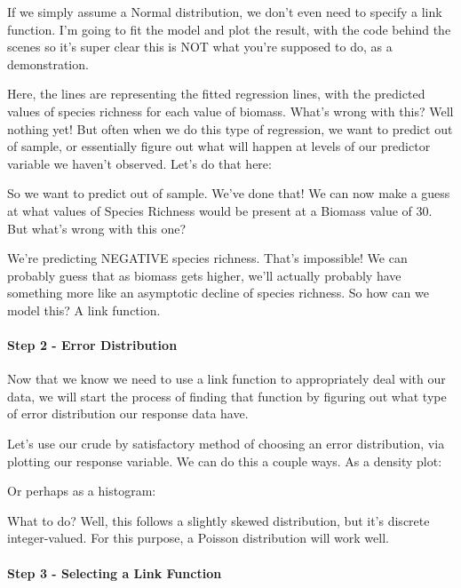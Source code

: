 \documentclass[
]{article}
\begin{document}
If we simply assume a Normal distribution, we don't even need to specify
a link function. I'm going to fit the model and plot the result, with
the code behind the scenes so it's super clear this is NOT what you're
supposed to do, as a demonstration.

Here, the lines are representing the fitted regression lines, with the
predicted values of species richness for each value of biomass. What's
wrong with this? Well nothing yet! But often when we do this type of
regression, we want to predict out of sample, or essentially figure out
what will happen at levels of our predictor variable we haven't
observed. Let's do that here:

So we want to predict out of sample. We've done that! We can now make a
guess at what values of Species Richness would be present at a Biomass
value of 30. But what's wrong with this one?

We're predicting NEGATIVE species richness. That's impossible! We can
probably guess that as biomass gets higher, we'll actually probably have
something more like an asymptotic decline of species richness. So how
can we model this? A link function.

\hypertarget{step-2---error-distribution}{%
\paragraph{Step 2 - Error
Distribution}\label{step-2---error-distribution}}

Now that we know we need to use a link function to appropriately deal
with our data, we will start the process of finding that function by
figuring out what type of error distribution our response data have.

Let's use our crude by satisfactory method of choosing an error
distribution, via plotting our response variable. We can do this a
couple ways. As a density plot:

Or perhaps as a histogram:

What to do? Well, this follows a slightly skewed distribution, but it's
discrete integer-valued. For this purpose, a Poisson distribution will
work well.

\hypertarget{step-3---selecting-a-link-function}{%
\paragraph{Step 3 - Selecting a Link
Function}\label{step-3---selecting-a-link-function}}
\end{document}
